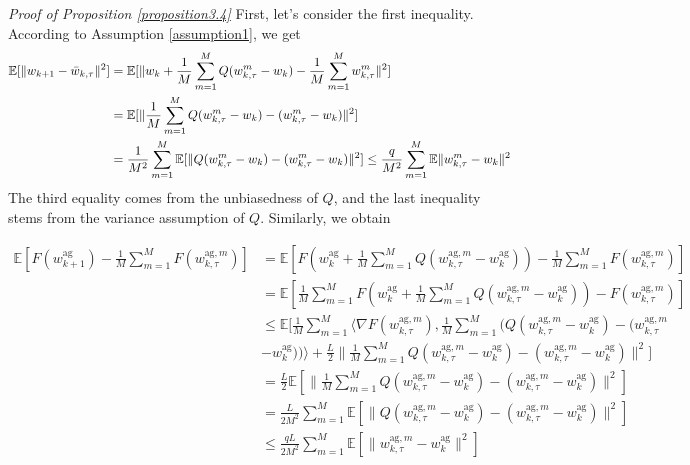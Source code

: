 \documentclass[11pt]{article}
\begin{document}
\emph{Proof of Proposition \ref{proposition3.4}} \textrm{ } First, let's consider the first inequality. According to Assumption \ref{assumption1}, we get
\begin{align*}
    \mathbb{E}[\|w_{k+1} - \Bar{w}_{k, \tau}\|^2] &= \mathbb{E}[\|w_k + \frac{1}{M} \sum_{m=1}^M Q(w_{k, \tau}^m - w_k) - \frac{1}{M} \sum_{m=1}^M w_{k, \tau}^m\|^2] \\
    &= \mathbb{E}[\|\frac{1}{M} \sum_{m=1}^M Q(w_{k, \tau}^m - w_k) - (w_{k, \tau}^m - w_k)\|^2] \\
    &= \frac{1}{M^2} \sum_{m=1}^M \mathbb{E}[\|Q(w_{k, \tau}^m - w_k) - (w_{k, \tau}^m -w_k)\|^2] \leq \frac{q}{M^2} \sum_{m=1}^M \mathbb{E} \|w_{k, \tau}^m - w_k\|^2
\end{align*}
The third equality comes from the unbiasedness of $Q$, and the last inequality stems from the variance assumption of $Q$. Similarly, we obtain

\begin{align*}
    \mathbb{E}[F(w_{k+1}^{\textrm{ag}}) - \frac{1}{M} \sum_{m=1}^M F(w_{k, \tau}^{\textrm{ag}, m})] &= \mathbb{E}[F(w_k^{\textrm{ag}} + \frac{1}{M}\sum_{m=1}^M Q(w_{k, \tau}^{\textrm{ag}, m} - w_k^{\textrm{ag}})) - \frac{1}{M} \sum_{m=1}^M F(w_{k, \tau}^{\textrm{ag}, m})] \\
    &= \mathbb{E}[\frac{1}{M} \sum_{m=1}^M F(w_k^{\textrm{ag}} + \frac{1}{M}\sum_{m=1}^M Q(w_{k, \tau}^{\textrm{ag}, m} - w_k^{\textrm{ag}})) - F(w_{k, \tau}^{\textrm{ag}, m})] \\
    &\leq \mathbb{E}\Big[\frac{1}{M} \sum_{m=1}^M \langle \nabla F(w_{k, \tau}^{\textrm{ag}, m}), \frac{1}{M} \sum_{m=1}^M \Big( Q(w_{k, \tau}^{\textrm{ag}, m} - w_k^{\textrm{ag}}) - (w_{k, \tau}^{\textrm{ag}, m} \\
    &- w_k^{\textrm{ag}})\Big) \rangle + \frac{L}{2} \|\frac{1}{M} \sum_{m=1}^M  Q(w_{k, \tau}^{\textrm{ag}, m} - w_k^{\textrm{ag}}) - (w_{k, \tau}^{\textrm{ag}, m} - w_k^{\textrm{ag}})\|^2\Big] \\
    &= \frac{L}{2} \mathbb{E}[\|\frac{1}{M} \sum_{m=1}^M  Q(w_{k, \tau}^{\textrm{ag}, m} - w_k^{\textrm{ag}}) - (w_{k, \tau}^{\textrm{ag}, m} - w_k^{\textrm{ag}})\|^2] \\
    &= \frac{L}{2M^2}\sum_{m=1}^M \mathbb{E}[\| Q(w_{k, \tau}^{\textrm{ag}, m} - w_k^{\textrm{ag}}) - (w_{k, \tau}^{\textrm{ag}, m} - w_k^{\textrm{ag}})\|^2] \\
    &\leq \frac{qL}{2M^2} \sum_{m=1}^M \mathbb{E}[\|w_{k, \tau}^{\textrm{ag}, m} - w_k^{\textrm{ag}}\|^2]
\end{align*}
\end{document}
